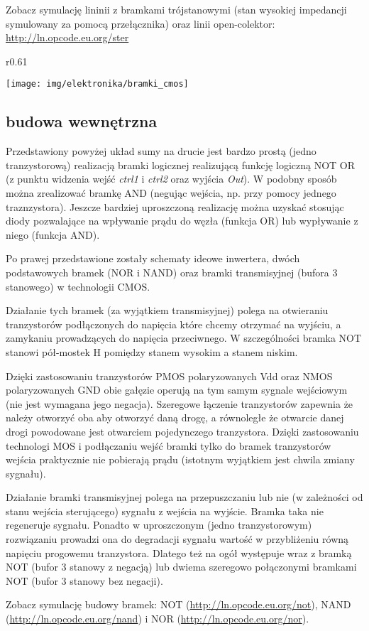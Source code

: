 Zobacz symulację lininii z bramkami trójstanowymi (stan wysokiej impedancji symulowany za pomocą przełącznika) oraz linii open-colektor: \url{http://ln.opcode.eu.org/ster}

\begin{wrapfigure}{r}{0.61\textwidth}
  \begin{center}
    \vspace{-45pt}
    \texttt{[image: img/elektronika/bramki\_cmos]}
    \vspace{-35pt}
  \end{center}
\end{wrapfigure}
\subsection{budowa wewnętrzna}
Przedstawiony powyżej układ sumy na drucie jest bardzo prostą (jedno tranzystorową) realizacją bramki logicznej realizującą funkcję logiczną NOT OR (z punktu widzenia wejść \textit{ctrl1} i \textit{ctrl2} oraz wyjścia \textit{Out}).
W podobny sposób można zrealizować bramkę AND (negując wejścia, np. przy pomocy jednego traznzystora).
Jeszcze bardziej uproszczoną realizację można uzyskać stosując diody pozwalające na wpływanie prądu do węzła (funkcja OR) lub wypływanie z niego (funkcja AND).

Po prawej przedstawione zostały schematy ideowe inwertera, dwóch podstawowych bramek (NOR i NAND) oraz bramki transmisyjnej (bufora 3 stanowego) w technologii CMOS.

Działanie tych bramek (za wyjątkiem transmisyjnej) polega na otwieraniu tranzystorów podłączonych do napięcia które chcemy otrzymać na wyjściu, a zamykaniu prowadzących do napięcia przeciwnego. W szczególności bramka NOT stanowi pół-mostek H pomiędzy stanem wysokim a stanem niskim.

Dzięki zastosowaniu tranzystorów PMOS polaryzowanych Vdd oraz NMOS polaryzowanych GND obie gałęzie operują na tym samym sygnale wejściowym (nie jest wymagana jego negacja). Szeregowe łączenie tranzystorów zapewnia że należy otworzyć oba aby otworzyć daną drogę, a równoległe że otwarcie danej drogi powodowane jest otwarciem pojedynczego tranzystora. Dzięki zastosowaniu technologi MOS i podłączaniu wejść bramki tylko do bramek tranzystorów wejścia praktycznie nie pobierają prądu (istotnym wyjątkiem jest chwila zmiany sygnału).

Działanie bramki transmisyjnej polega na przepuszczaniu lub nie (w zależności od stanu wejścia sterującego) sygnału z wejścia na wyjście. Bramka taka nie regeneruje sygnału. Ponadto w uproszczonym (jedno tranzystorowym) rozwiązaniu prowadzi ona do degradacji sygnału wartość w przybliżeniu równą napięciu progowemu tranzystora. Dlatego też na ogół występuje wraz z bramką NOT (bufor 3 stanowy z negacją) lub dwiema szeregowo połączonymi bramkami NOT (bufor 3 stanowy bez negacji).

Zobacz symulację budowy bramek: NOT (\url{http://ln.opcode.eu.org/not}), NAND (\url{http://ln.opcode.eu.org/nand}) i NOR (\url{http://ln.opcode.eu.org/nor}).

\setcounter{subsection}{0}
